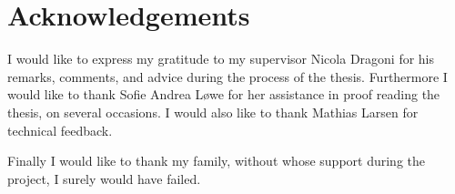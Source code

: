 \chapter{Acknowledgements}
	I would like to express my gratitude to my supervisor Nicola Dragoni for his remarks, comments, and advice during the process of the thesis. Furthermore I would like to thank Sofie Andrea Løwe for her assistance in proof reading the thesis, on several occasions. I would also like to thank Mathias Larsen for technical feedback.

	Finally I would like to thank my family, without whose support during the project, I surely would have failed.